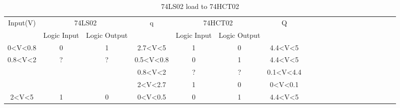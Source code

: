 	\begin{center}
	\begin{table}[h!]
	\begin{tabular}{llllllllllllllllllll}
	\cline{1-7}
	\multicolumn{1}{|c|}{\multirow{2}{*}{Input(V)}} & \multicolumn{2}{c|}{74LS02} & \multicolumn{1}{c|}{\multirow{2}{*}{q}} & \multicolumn{2}{c|}{74HCT02} & \multicolumn{1}{c|}{\multirow{2}{*}{Q}}  \\ \cline{2-3} \cline{5-6}
	\multicolumn{1}{|c|}{} & \multicolumn{1}{c|}{Logic Input} & \multicolumn{1}{c|}{Logic Output} & \multicolumn{1}{c|}{} & \multicolumn{1}{c|}{Logic Input} & \multicolumn{1}{c|}{Logic Output} & \multicolumn{1}{c|}{}  \\ \cline{1-7}
	\multicolumn{1}{|c|}{0\textless{}V\textless{}0.8} & \multicolumn{1}{c|}{0} & \multicolumn{1}{c|}{1} & \multicolumn{1}{c|}{2.7\textless{}V\textless{}5} & \multicolumn{1}{c|}{1} & \multicolumn{1}{c|}{0} & \multicolumn{1}{c|}{4.4\textless{}V\textless{}5}  \\ \cline{1-7}
	\multicolumn{1}{|c|}{\multirow{3}{*}{0.8\textless{}V\textless{}2}} & \multicolumn{1}{c|}{\multirow{3}{*}{?}} & \multicolumn{1}{c|}{\multirow{3}{*}{?}} & \multicolumn{1}{c|}{0.5\textless{}V\textless{}0.8} & \multicolumn{1}{c|}{0} & \multicolumn{1}{c|}{1} & \multicolumn{1}{c|}{4.4\textless{}V\textless{}5}  \\ \cline{4-7}
	\multicolumn{1}{|c|}{} & \multicolumn{1}{c|}{} & \multicolumn{1}{c|}{} & \multicolumn{1}{c|}{0.8\textless{}V\textless{}2} & \multicolumn{1}{c|}{?} & \multicolumn{1}{c|}{?} & \multicolumn{1}{c|}{0.1\textless{}V\textless{}4.4}  \\ \cline{4-7}
	\multicolumn{1}{|c|}{} & \multicolumn{1}{c|}{} & \multicolumn{1}{c|}{} & \multicolumn{1}{c|}{2\textless{}V\textless{}2.7} & \multicolumn{1}{c|}{1} & \multicolumn{1}{c|}{0} & \multicolumn{1}{c|}{0\textless{}V\textless{}0.1}  \\ \cline{1-7}
	\multicolumn{1}{|c|}{2\textless{}V\textless{}5} & \multicolumn{1}{c|}{1} & \multicolumn{1}{c|}{0} & \multicolumn{1}{c|}{0\textless{}V\textless{}0.5} & \multicolumn{1}{c|}{0} & \multicolumn{1}{c|}{1} & \multicolumn{1}{c|}{4.4\textless{}V\textless{}5}\\ \cline{1-7}
	\end{tabular}
	\caption{\color{cyan}74LS02 load to 74HCT02}
	\label{fig:ej2thlstohct}
	\end{table}
	\end{center}
	
